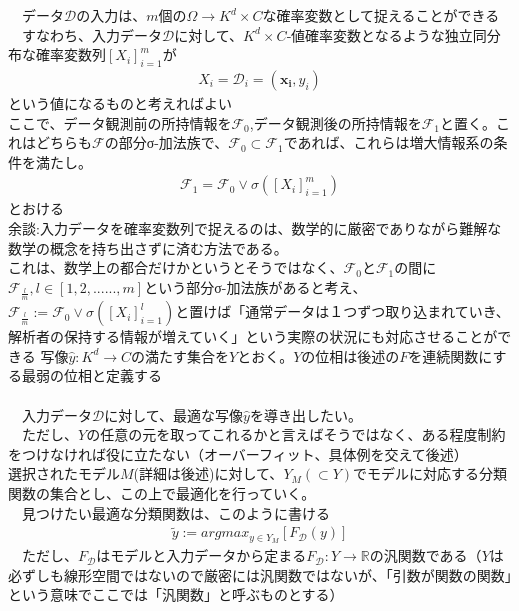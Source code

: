 \documentclass{jsarticle}
\begin{document}
　データ$\mathcal{D}$の入力は、$m$個の$\Omega\rightarrow K^d\times C$な確率変数として捉えることができる\\
　すなわち、入力データ$\mathcal{D}$に対して、$K^d\times C$‐値確率変数となるような独立同分布な確率変数列$[X_i]^m_{i=1}$が
\begin{eqnarray}
X_i=\mathcal{D}_i=(\bm{x_i},y_i)
\end{eqnarray}
という値になるものと考えればよい\\
 ここで、データ観測前の所持情報を$\mathcal{F}_0$,データ観測後の所持情報を$\mathcal{F}_1$と置く。これはどちらも$\mathcal{F}$の部分σ-加法族で、$\mathcal{F}_0\subset\mathcal{F}_1$であれば、これらは増大情報系の条件を満たし。\\
\begin{eqnarray}
\mathcal{F}_1=\mathcal{F}_0\vee\sigma([X_i]^m_{i=1})
\end{eqnarray}
とおける\\
余談:入力データを確率変数列で捉えるのは、数学的に厳密でありながら難解な数学の概念を持ち出さずに済む方法である。\\
これは、数学上の都合だけかというとそうではなく、$\mathcal{F}_0$と$\mathcal{F}_1$の間に$\mathcal{F}_{\frac{l}{m}},l\in[1,2,......,m]$という部分σ-加法族があると考え、$\mathcal{F}_{\frac{l}{m}}:=\mathcal{F}_0\vee\sigma([X_i]^l_{i=1})$と置けば「通常データは１つずつ取り込まれていき、解析者の保持する情報が増えていく」という実際の状況にも対応させることができる
\newpage
写像$\hat{y}:K^d\rightarrow C$の満たす集合を$Y$とおく。$Y$の位相は後述の$F$を連続関数にする最弱の位相と定義する\\
　\\ 
　入力データ$\mathcal{D}$に対して、最適な写像$\hat{y}$を導き出したい。\\
　ただし、$Y$の任意の元を取ってこれるかと言えばそうではなく、ある程度制約をつけなければ役に立たない（オーバーフィット、具体例を交えて後述）\\
選択されたモデル$M$(詳細は後述)に対して、$Y_M(\subset Y)$でモデルに対応する分類関数の集合とし、この上で最適化を行っていく。\\
　見つけたい最適な分類関数は、このように書ける
\begin{eqnarray}
\tilde{y}:=argmax_{y\in Y_M}[F_\mathcal{D}(y)]
\end{eqnarray}
　ただし、$F_\mathcal{D}$はモデルと入力データから定まる$F_\mathcal{D}:Y\rightarrow\mathbb{R}$の汎関数である（$Y$は必ずしも線形空間ではないので厳密には汎関数ではないが、「引数が関数の関数」という意味でここでは「汎関数」と呼ぶものとする）\\
\end{document}
